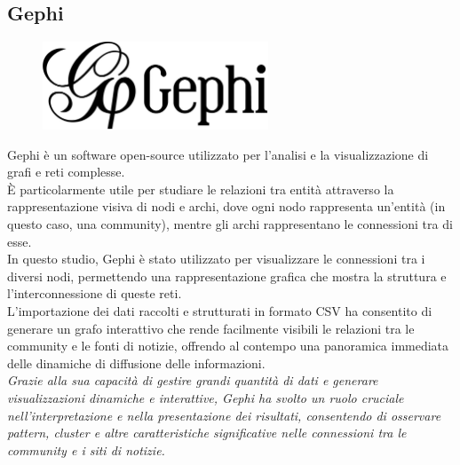 \documentclass[12pt]{article}
\begin{document}
	\subsection{Gephi}
		\begin{figure}[H]
		\centering
		\includegraphics[width=0.6\textwidth]{immagini/gephilogo}
	\end{figure}
	Gephi è un software open-source utilizzato per l'analisi e la visualizzazione di grafi e reti complesse. \\È particolarmente utile per studiare le relazioni tra entità attraverso la rappresentazione visiva di nodi e archi, dove ogni nodo rappresenta un'entità (in questo caso, una community), mentre gli archi rappresentano le connessioni tra di esse. \\In questo studio, Gephi è stato utilizzato per visualizzare le connessioni tra i diversi nodi, permettendo una rappresentazione grafica che mostra la struttura e l'interconnessione di queste reti. \\L'importazione dei dati raccolti e strutturati in formato CSV ha consentito di generare un grafo interattivo che rende facilmente visibili le relazioni tra le community e le fonti di notizie, offrendo al contempo una panoramica immediata delle dinamiche di diffusione delle informazioni.\\ 
	\textit{Grazie alla sua capacità di gestire grandi quantità di dati e generare visualizzazioni dinamiche e interattive, Gephi ha svolto un ruolo cruciale nell'interpretazione e nella presentazione dei risultati, consentendo di osservare pattern, cluster e altre caratteristiche significative nelle connessioni tra le community e i siti di notizie.}
\end{document}
